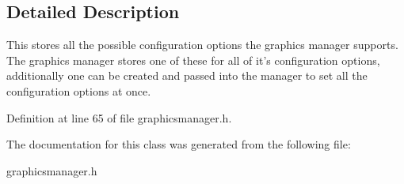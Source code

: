 \subsection{Detailed Description}
This stores all the possible configuration options the graphics manager supports. The graphics manager stores one of these for all of it's configuration options, additionally one can be created and passed into the manager to set all the configuration options at once. 

Definition at line 65 of file graphicsmanager.h.



The documentation for this class was generated from the following file:\begin{DoxyCompactItemize}
\item 
graphicsmanager.h\end{DoxyCompactItemize}
